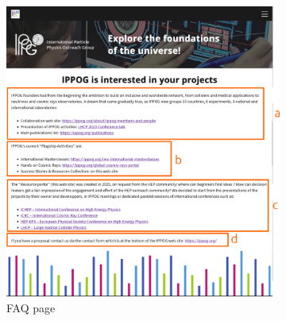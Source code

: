 \begin{landscape}
    \begin{figure}[p]
        \centering
        \begin{subfigure}[c]{.5\textwidth}
            \centering
            \includegraphics[width=1.2\linewidth]{Image/Architecture/structure_faq.png}
            \caption{FAQ page}
            \label{fig:structure_faq}
        \end{subfigure}
        \hspace{3cm}
        \begin{subfigure}[c]{.5\textwidth}
            \centering

\end{subfigure}
\end{figure}
\end{landscape}
